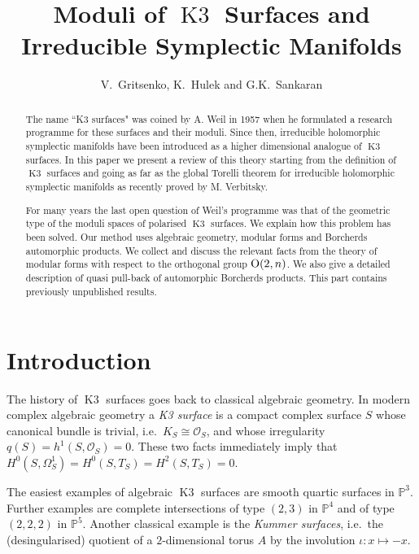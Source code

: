 \documentclass[a4paper,11pt]{article}
\newcommand{\PP}{\mathbb P}
\newcommand{\cO}{\mathcal O}
\newcommand{\Orth}{\mathop{\null\mathrm {O}}\nolimits}
\newcommand{\Kthree}{\mathop{\mathrm {K3}}\nolimits}
\begin{document}
\title{Moduli of $\Kthree$ Surfaces and Irreducible Symplectic Manifolds}
\author{V.~Gritsenko, K.~Hulek and G.K.~Sankaran}
\date{}
\maketitle
\begin{abstract}
\noindent
The name ``K3 surfaces" was coined by A. Weil in 1957 when he formulated
a research programme for these surfaces and their moduli.
Since then, irreducible holomorphic symplectic manifolds have been
introduced as a higher dimensional analogue of $\Kthree$ surfaces.
In this paper we present a review of this theory starting from the
definition of $\Kthree$ surfaces and going as far as the global Torelli theorem
for irreducible holomorphic symplectic manifolds as recently proved by
M. Verbitsky.

For many years the last open question of Weil's programme was that of
the geometric type of the moduli spaces of polarised $\Kthree$ surfaces.
We explain how this problem has been solved.
Our method uses algebraic geometry, modular forms and Borcherds
automorphic products. We collect and discuss the relevant facts
from the theory of  modular forms with respect to the orthogonal group
$\Orth(2,n)$. We also give a detailed description of quasi pull-back
of automorphic Borcherds products. This part contains previously
unpublished  results. 
\end{abstract}

\tableofcontents

\section{Introduction}\label{sect:introduction}

The history of $\Kthree$ surfaces goes back to classical algebraic
geometry. In modern complex algebraic geometry a \emph{K3 surface} is
a compact complex surface $S$ whose canonical bundle is trivial,
i.e.\ $K_S\cong\cO_S$, and whose irregularity $q(S)=h^1(S,\cO_S)=0$.
These two facts immediately imply that
$H^0(S,\Omega^1_S)=H^0(S,T_S)=H^2(S,T_S)=0$.

The easiest examples of algebraic $\Kthree$ surfaces are smooth quartic
surfaces in $\PP^3$. Further examples are complete intersections of
type $(2,3)$ in $\PP^4$ and of type $(2,2,2)$ in $\PP^5$. Another
classical example is the \emph{Kummer surfaces}, i.e.\ the
(desingularised) quotient of a $2$-dimensional torus $A$ by the
involution $\iota\colon  x \mapsto -x$.
\end{document}
